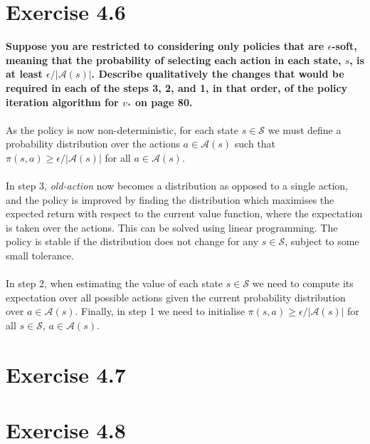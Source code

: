 \documentclass[a4paper,11pt]{article}
\numberwithin{equation}{section}
\theoremstyle{remark}
\begin{document}
\section{Exercise 4.6}

\textbf{Suppose you are restricted to considering only policies that are $\epsilon$-soft, meaning that the probability of selecting each action in each state, $s$, is at least $\epsilon/|\mathcal{A}(s)|$. Describe qualitatively the changes that would be required in each of the steps 3, 2, and 1, in that order, of the policy iteration algorithm for $v_*$ on page 80.}
\\ \\
As the policy is now non-deterministic, for each state $s \in \mathcal{S}$ we must define a probability distribution over the actions $a \in \mathcal{A}(s)$ such that $\pi(s, a) \geq \epsilon/|\mathcal{A}(s)|$ for all $a \in \mathcal{A}(s)$. 
\\ \\
In step 3, \emph{old-action} now becomes a distribution as opposed to a single action, and the policy is improved by finding the distribution which maximises the expected return with respect to the current value function, where the expectation is taken over the actions. This can be solved using linear programming. The policy is stable if the distribution does not change for any $s \in \mathcal{S}$, subject to some small tolerance.
\\ \\
In step 2, when estimating the value of each state $s \in \mathcal{S}$ we need to compute its expectation over all possible actions given the current probability distribution over $a \in \mathcal{A}(s)$. Finally, in step 1 we need to initialise $\pi(s, a) \geq \epsilon/|\mathcal{A}(s)|$ for all $s \in \mathcal{S}$, $a \in \mathcal{A}(s)$.


\section{Exercise 4.7}


\section{Exercise 4.8}
\end{document}
